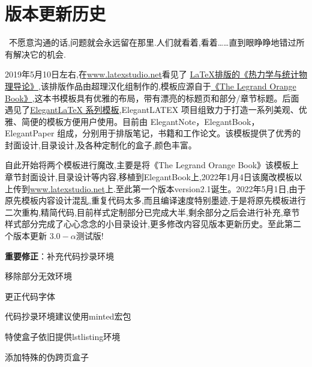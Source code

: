 \chapter{版本更新历史}
\begin{center}
\textcolor[RGB]{255, 0, 0}{\faHeart}~不愿意沟通的话,问题就会永远留在那里.人们就看着,看着……直到眼睁睁地错过所有解决它的机会.~\textcolor[RGB]{255, 0, 0}{\faHeart}
\end{center}
\begin{center}
\end{center}

2019年5月10日左右,在\href{latexstudio论坛}{www.latexstudio.net}看见了
\href{https://www.latexstudio.net/archives/10715.html}{LaTeX排版的《热力学与统计物理导论》},该排版作品由超理汉化组制作的,模板应源自于\href{http://www.latextemplates.com/template/the-legrand-orange-book}{《The Legrand Orange Book》},这本书模板具有优雅的布局，带有漂亮的标题页和部分/章节标题。后面遇见了\href{https://elegantlatex.org/}{Elegant\LaTeX{} 系列模板},ElegantLATEX 项目组致力于打造一系列美观、优雅、简便的模板方便用户使用。目前由
ElegantNote，ElegantBook，ElegantPaper 组成，分别用于排版笔记，书籍和工作论文。该模板提供了优秀的封面设计,目录设计,及各种定制化的盒子,颜色丰富。

自此开始将两个模板进行魔改,主要是将《The Legrand Orange Book》该模板上章节封面设计,目录设计等内容,移植到ElegantBook上,2022年1月4日该魔改模板以上传到\href{latexstudio论坛}{www.latexstudio.net}上.至此第一个版本version2.1诞生。2022年5月1日,由于原先模板内容设计混乱,重复代码太多,而且编译速度特别墨迹,于是将原先模板进行二次重构,精简代码,目前样式定制部分已完成大半,剩余部分之后会进行补充,章节样式部分完成了心心念念的小目录设计,更多修改内容见版本更新历史。至此第二个版本更新
$3.0-\alpha$测试版!


\begin{change}
    \item \textbf{重要修正}：补充代码抄录环境
    \item 移除部分无效环境
    \item 更正代码字体
    \item 代码抄录环境建议使用minted宏包
    \item 特使盒子依旧提供lstlisting环境
    \item 添加特殊的伪跨页盒子
\end{change}


